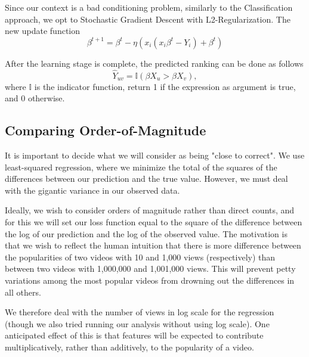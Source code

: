 Since our context is a bad conditioning problem, similarly to the Classification approach, we opt to Stochastic Gradient Descent with L2-Regularization. The new update function
	\begin{equation}
		\beta^{t+1} = \beta^t - \eta (x_i (x_i\beta^t - Y_i) + \beta^t)
	\end{equation}

After the learning stage is complete, the predicted ranking can be done as follows
\begin{equation}
\hat{Y}_{uv} = \mathbb{I}(\beta X_u > \beta X_v),
\end{equation}
where $\mathbb{I}$ is the indicator function, return 1 if the expression as argument is true, and 0 otherwise.

\subsection{Comparing Order-of-Magnitude}
\label{sec:orderofmagnitude}
	It is important to decide what we will consider as being "close to correct".  We use least-squared regression, where we minimize the total of the squares of the differences between our prediction and the true value.  However, we must deal with the gigantic variance in our observed data.

	Ideally, we wish to consider orders of magnitude rather than direct counts, and for this we will set our loss function equal to the square of the difference between the log of our prediction and the log of the observed value.  The motivation is that we wish to reflect the human intuition that there is more difference between the popularities of two videos with 10 and 1,000 views (respectively) than between two videos with 1,000,000 and 1,001,000 views.  This will prevent petty variations among the most popular videos from drowning out the differences in all others.

	We therefore deal with the number of views in log scale for the regression (though we also tried running our analysis without using log scale).  One anticipated effect of this is that features will be expected to contribute multiplicatively, rather than additively, to the popularity of a video.
